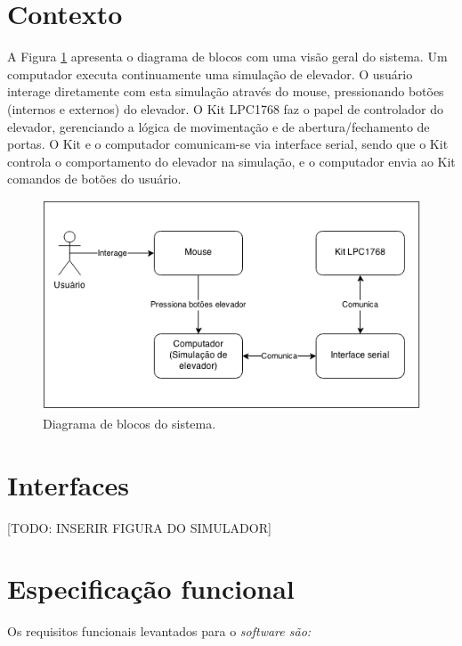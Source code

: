 \section{Contexto}

A Figura \ref{fig:diagrama_blocos} apresenta o diagrama de blocos com uma visão geral do sistema. Um computador executa continuamente uma simulação de elevador. O usuário interage diretamente com esta simulação através do mouse, pressionando botões (internos e externos) do elevador. O Kit LPC1768 faz o papel de controlador do elevador, gerenciando a lógica de movimentação e de abertura/fechamento de portas. O Kit e o computador comunicam-se via interface serial, sendo que o Kit controla o comportamento do elevador na simulação, e o computador envia ao Kit comandos de botões do usuário. 

\begin{figure}[h]
\begin{center}
    \includegraphics[width=0.8\columnwidth]{./figures/diagrama_blocos.png}
    \caption{Diagrama de blocos do sistema.}
    \label{fig:diagrama_blocos}
\end{center}
\end{figure}


\section{Interfaces}
[TODO: INSERIR FIGURA DO SIMULADOR]


\section{Especificação funcional}



Os requisitos funcionais levantados para o \it{software} são:

